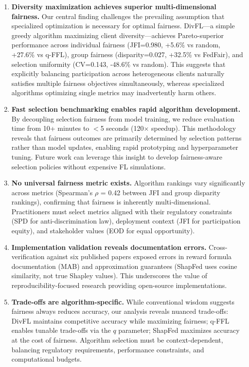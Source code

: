 \documentclass{article}
\begin{document}
\begin{enumerate}
\item \textbf{Diversity maximization achieves superior multi-dimensional fairness.} Our central finding challenges the prevailing assumption that specialized optimization is necessary for optimal fairness. DivFL—a simple greedy algorithm maximizing client diversity—achieves Pareto-superior performance across individual fairness (JFI=0.980, +5.6\% vs random, +27.6\% vs q-FFL), group fairness (disparity=0.027, +32.5\% vs FedFair), and selection uniformity (CV=0.143, -48.6\% vs random). This suggests that explicitly balancing participation across heterogeneous clients naturally satisfies multiple fairness objectives simultaneously, whereas specialized algorithms optimizing single metrics may inadvertently harm others.

\item \textbf{Fast selection benchmarking enables rapid algorithm development.} By decoupling selection fairness from model training, we reduce evaluation time from 10+ minutes to $<$5 seconds (120$\times$ speedup). This methodology reveals that fairness outcomes are primarily determined by selection patterns rather than model updates, enabling rapid prototyping and hyperparameter tuning. Future work can leverage this insight to develop fairness-aware selection policies without expensive FL simulations.

\item \textbf{No universal fairness metric exists.} Algorithm rankings vary significantly across metrics (Spearman's $\rho$ = 0.42 between JFI and group disparity rankings), confirming that fairness is inherently multi-dimensional. Practitioners must select metrics aligned with their regulatory constraints (SPD for anti-discrimination law), deployment context (JFI for participation equity), and stakeholder values (EOD for equal opportunity).

\item \textbf{Implementation validation reveals documentation errors.} Cross-verification against six published papers exposed errors in reward formula documentation (MAB) and approximation guarantees (ShapFed uses cosine similarity, not true Shapley values). This underscores the value of reproducibility-focused research providing open-source implementations.

\item \textbf{Trade-offs are algorithm-specific.} While conventional wisdom suggests fairness always reduces accuracy, our analysis reveals nuanced trade-offs: DivFL maintains competitive accuracy while maximizing fairness; q-FFL enables tunable trade-offs via the $q$ parameter; ShapFed maximizes accuracy at the cost of fairness. Algorithm selection must be context-dependent, balancing regulatory requirements, performance constraints, and computational budgets.
\end{enumerate}
\end{document}
